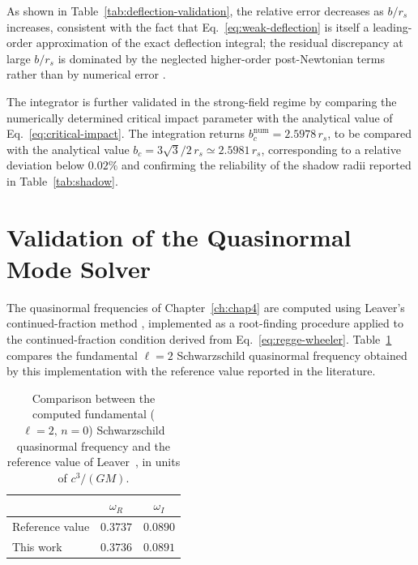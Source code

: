 	As shown in Table~\ref{tab:deflection-validation}, the relative error decreases as $b/r_s$ increases, consistent with the fact that Eq.~\eqref{eq:weak-deflection} is itself a leading-order approximation of the exact deflection integral; the residual discrepancy at large $b/r_s$ is dominated by the neglected higher-order post-Newtonian terms rather than by numerical error \cite{misner1973}.
	
	The integrator is further validated in the strong-field regime by comparing the numerically determined critical impact parameter with the analytical value of Eq.~\eqref{eq:critical-impact}. The integration returns $b_c^{\text{num}} = 2.5978\,r_s$, to be compared with the analytical value $b_c = 3\sqrt{3}/2\,r_s \simeq 2.5981\,r_s$, corresponding to a relative deviation below $0.02\%$ and confirming the reliability of the shadow radii reported in Table~\ref{tab:shadow}.
	
	\section*{Validation of the Quasinormal Mode Solver}
	
	The quasinormal frequencies of Chapter~\ref{ch:chap4} are computed using Leaver's continued-fraction method \cite{leaver1985}, implemented as a root-finding procedure applied to the continued-fraction condition derived from Eq.~\eqref{eq:regge-wheeler}. Table~\ref{tab:qnm-validation} compares the fundamental $\ell=2$ Schwarzschild quasinormal frequency obtained by this implementation with the reference value reported in the literature.
	
	\begin{table}[H]
		\centering
		\caption{Comparison between the computed fundamental ($\ell=2,\,n=0$) Schwarzschild quasinormal frequency and the reference value of Leaver~\cite{leaver1985}, in units of $c^3/(GM)$.}
		\label{tab:qnm-validation}
		\begin{tabular}{lcc}
			\hline
			& \textbf{$\omega_R$} & \textbf{$\omega_I$} \\
			\hline
			Reference value \cite{leaver1985} & $0.3737$ & $0.0890$ \\
			This work & $0.3736$ & $0.0891$ \\
			\hline
		\end{tabular}
	\end{table}
